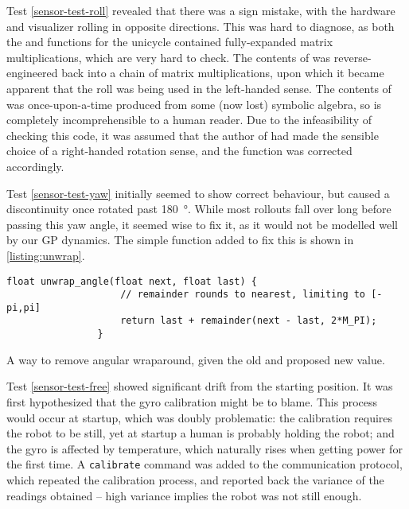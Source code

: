 \documentclass[main.tex]{subfiles}
\begin{document}
		Test \ref{sensor-test-roll} revealed that there was a sign mistake, with the hardware and visualizer rolling in opposite directions.
		This was hard to diagnose, as both the  and  functions for the unicycle contained fully-expanded matrix multiplications, which are very hard to check.
		The contents of  was reverse-engineered back into a chain of matrix multiplications, upon which it became apparent that the roll was being used in the left-handed sense.
		The contents of  was once-upon-a-time produced from some (now lost) symbolic algebra, so is completely incomprehensible to a human reader.
		Due to the infeasibility of checking this code, it was assumed that the author of  had made the sensible choice of a right-handed rotation sense, and the  function was corrected accordingly.

		Test \cref{sensor-test-yaw} initially seemed to show correct behaviour, but caused a discontinuity once rotated past \SI{180}{\degree}.
		While most rollouts fall over long before passing this yaw angle, it seemed wise to fix it, as it would not be modelled well by our GP dynamics.
		The simple function added to fix this is shown in \cref{listing:unwrap}.

		\begin{listingfloat}
			\begin{lstlisting}[language={[11]C++}, gobble=8, frame=single]
				float unwrap_angle(float next, float last) {
					// remainder rounds to nearest, limiting to [-pi,pi]
					return last + remainder(next - last, 2*M_PI);
				}
			\end{lstlisting}
			\caption{A way to remove angular wraparound, given the old and proposed new value.}
			\label{listing:unwrap}
		\end{listingfloat}

		Test \cref{sensor-test-free} showed significant drift from the starting position.
		It was first hypothesized that the gyro calibration might be to blame.
		This process would occur at startup, which was doubly problematic: the calibration requires the robot to be still, yet at startup a human is probably holding the robot; and the gyro is affected by temperature, which naturally rises when getting power for the first time.
		A \texttt{calibrate} command was added to the communication protocol, which repeated the calibration process, and reported back the variance of the readings obtained -- high variance implies the robot was not still enough.
\end{document}
